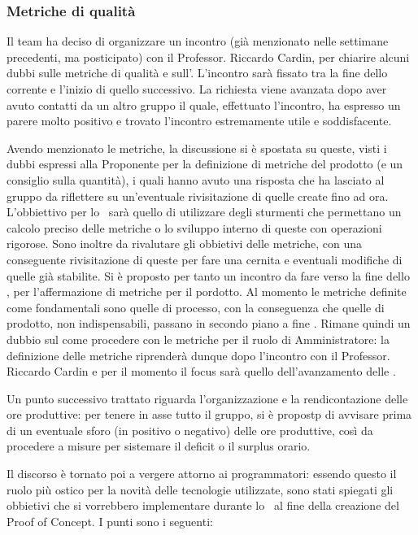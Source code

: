 \subsubsection{Metriche di qualità}
\par Il team ha deciso di organizzare un incontro (già menzionato nelle settimane precedenti, ma posticipato) con il Professor. Riccardo Cardin, per chiarire alcuni dubbi sulle metriche di qualità e sull'\AdR. L'incontro sarà fissato tra la fine dello  corrente e l'inizio di quello successivo.
La richiesta viene avanzata dopo aver avuto contatti da un altro gruppo il quale, effettuato l'incontro, ha espresso un parere molto positivo e trovato l'incontro estremamente utile e soddisfacente.
\par Avendo menzionato le metriche, la discussione si è spostata su queste, visti i dubbi espressi alla Proponente per la definizione di metriche del prodotto (e un consiglio sulla quantità), i quali hanno avuto una risposta che ha lasciato al gruppo da riflettere su un'eventuale rivisitazione di quelle create fino ad ora. 
L'obbiettivo per lo \ sarà quello di utilizzare degli sturmenti che permettano un calcolo preciso delle metriche o lo sviluppo interno di queste con operazioni rigorose. 
Sono inoltre da rivalutare gli obbietivi delle metriche, con una conseguente rivisitazione di queste per fare una cernita e eventuali modifiche di quelle già stabilite.
Si è proposto per tanto un incontro da fare verso la fine dello , per l'affermazione di metriche per il pordotto.
Al momento le metriche definite come fondamentali sono quelle di processo, con la conseguenza che quelle di prodotto, non indispensabili, passano in secondo piano a fine .
Rimane quindi un dubbio sul come procedere con le metriche per il ruolo di Amministratore: la definizione delle metriche riprenderà dunque dopo l'incontro con il Professor. Riccardo Cardin e per il momento il focus sarà quello dell'avanzamento delle \NdP.
\par Un punto successivo trattato riguarda l'organizzazione e la rendicontazione delle ore produttive: per tenere in asse tutto il gruppo, si è propostp di avvisare prima di un eventuale sforo (in positivo o negativo) delle ore produttive, così da procedere a misure per sistemare il deficit o il surplus orario.
\par Il discorso è tornato poi a vergere attorno ai programmatori: essendo questo il ruolo più ostico per la novità delle tecnologie utilizzate, sono stati spiegati gli obbietivi che si vorrebbero implementare durante lo \ al fine della creazione del Proof of Concept. I punti sono i seguenti:
